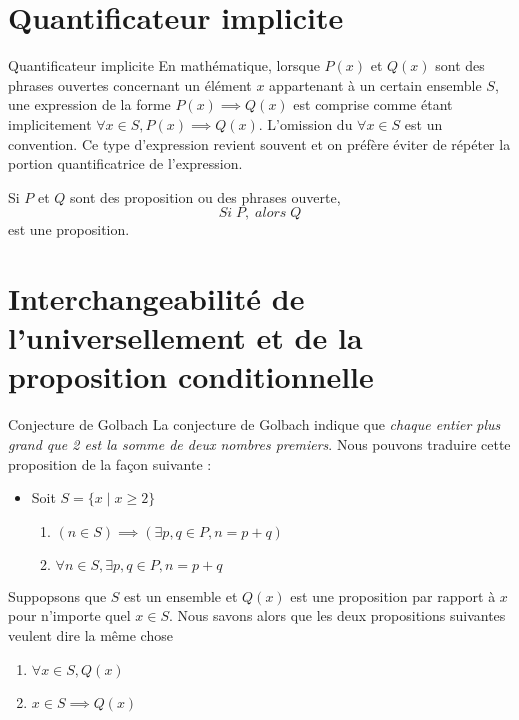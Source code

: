 \documentclass[16pt]{report}
\begin{document}
\begin{multicols*}{2}
            \section{Quantificateur implicite}
            \begin{Concept}{Quantificateur implicite}{}
                En mathématique, lorsque $P(x)$ et $Q(x)$ sont des phrases ouvertes concernant un élément $x$ 
                appartenant à un certain ensemble $S$, une expression de la forme $P(x) \implies  Q(x)$ 
                est comprise comme étant implicitement $\forall x \in S, P(x) \implies  Q(x)$. L'omission du 
                $\forall x \in S$ est un convention. Ce type d'expression revient souvent et on préfère éviter de 
                répéter la portion quantificatrice de l'expression. 
            \end{Concept}

           \begin{Definitionx}{}{}
               Si $P$ et $Q$ sont des proposition ou des phrases ouverte, 
               \[ Si \; P, \; alors \; Q\]
               est une proposition. 
           \end{Definitionx}
            \section{Interchangeabilité de l'universellement et de la proposition conditionnelle}
           \begin{EExample}{Conjecture de Golbach}{}
               La conjecture de Golbach indique que 
               \textit{chaque entier plus grand que 2 est la somme de deux nombres premiers}. Nous pouvons traduire 
               cette proposition de la façon suivante : 
               \begin{itemize}
                   \item Soit  $S = \{ x \;|\; x \geq 2\}$
                       \begin{enumerate}
                        \item $(n \in S) \implies  (\exists p, q \in P, n = p + q)$ 
                        \item $\forall n \in S, \exists p, q \in P, n = p + q$ 
                       \end{enumerate}
               \end{itemize}
           \end{EExample}



           \begin{Theorem}{}{}
               Suppopsons que $S$ est un ensemble et $Q(x)$ est une proposition par rapport à $x$ pour 
               n'importe quel $x \in S$. Nous savons alors que les deux propositions suivantes veulent dire 
               la même chose 
               \begin{enumerate}
                \item $\forall x \in S, Q(x)$
                \item  $x \in S \implies  Q(x)$
               \end{enumerate}
           \end{Theorem}


\end{multicols*}
\end{document}
